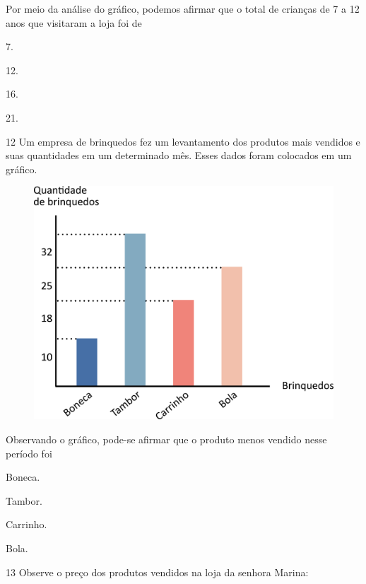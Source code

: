 Por meio da análise do gráfico, podemos afirmar que o total de crianças de 7 a 12 anos que visitaram a loja foi de

\begin{escolha}
\item
  7.
\item
  12.
\item
  16.
\item
  21.
\end{escolha}


\pagebreak
\num{12} Um empresa de brinquedos fez um levantamento dos produtos mais vendidos e suas quantidades em um determinado mês. Esses dados foram colocados em um gráfico.


\begin{figure}[htpb!]
\centering
\includegraphics[width=\textwidth]{./media/image119.png}
\end{figure}

Observando o gráfico, pode-se afirmar que o produto menos vendido nesse período foi

\begin{escolha}
\item
  Boneca.
\item
  Tambor.
\item
  Carrinho.
\item
  Bola.
\end{escolha}

\pagebreak
\num{13} Observe o preço dos produtos vendidos na loja da senhora Marina:

